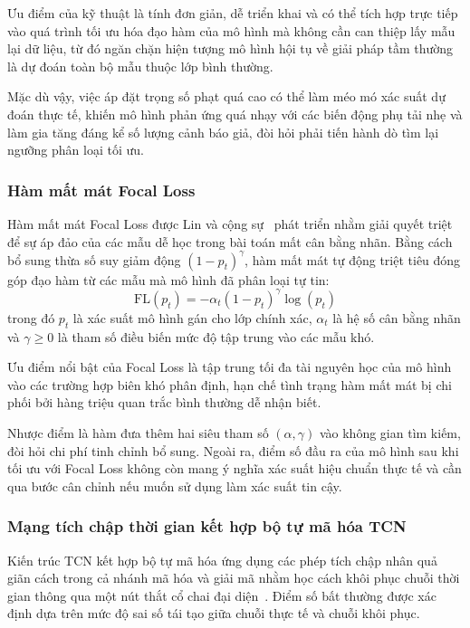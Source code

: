 Ưu điểm của kỹ thuật là tính đơn giản, dễ triển khai và có thể tích hợp trực tiếp vào quá trình tối ưu hóa đạo hàm của mô hình mà không cần can thiệp lấy mẫu lại dữ liệu, từ đó ngăn chặn hiện tượng mô hình hội tụ về giải pháp tầm thường là dự đoán toàn bộ mẫu thuộc lớp bình thường.

Mặc dù vậy, việc áp đặt trọng số phạt quá cao có thể làm méo mó xác suất dự đoán thực tế, khiến mô hình phản ứng quá nhạy với các biến động phụ tải nhẹ và làm gia tăng đáng kể số lượng cảnh báo giả, đòi hỏi phải tiến hành dò tìm lại ngưỡng phân loại tối ưu.

\subsubsection{Hàm mất mát Focal Loss}

Hàm mất mát Focal Loss được Lin và cộng sự~\cite{focal_loss} phát triển nhằm giải quyết triệt để sự áp đảo của các mẫu dễ học trong bài toán mất cân bằng nhãn. Bằng cách bổ sung thừa số suy giảm động $(1 - p_t)^\gamma$, hàm mất mát tự động triệt tiêu đóng góp đạo hàm từ các mẫu mà mô hình đã phân loại tự tin:
\begin{equation*}
    \mathrm{FL}(p_t) = -\alpha_t \left(1 - p_t\right)^{\gamma} \log\left(p_t\right)
\end{equation*}
trong đó $p_t$ là xác suất mô hình gán cho lớp chính xác, $\alpha_t$ là hệ số cân bằng nhãn và $\gamma \geq 0$ là tham số điều biến mức độ tập trung vào các mẫu khó.

Ưu điểm nổi bật của Focal Loss là tập trung tối đa tài nguyên học của mô hình vào các trường hợp biên khó phân định, hạn chế tình trạng hàm mất mát bị chi phối bởi hàng triệu quan trắc bình thường dễ nhận biết.

Nhược điểm là hàm đưa thêm hai siêu tham số $(\alpha, \gamma)$ vào không gian tìm kiếm, đòi hỏi chi phí tinh chỉnh bổ sung. Ngoài ra, điểm số đầu ra của mô hình sau khi tối ưu với Focal Loss không còn mang ý nghĩa xác suất hiệu chuẩn thực tế và cần qua bước cân chỉnh nếu muốn sử dụng làm xác suất tin cậy.

\subsubsection{Mạng tích chập thời gian kết hợp bộ tự mã hóa TCN}

Kiến trúc TCN kết hợp bộ tự mã hóa ứng dụng các phép tích chập nhân quả giãn cách trong cả nhánh mã hóa và giải mã nhằm học cách khôi phục chuỗi thời gian thông qua một nút thắt cổ chai đại diện~\cite{tcn, handigol2025}. Điểm số bất thường được xác định dựa trên mức độ sai số tái tạo giữa chuỗi thực tế và chuỗi khôi phục.

